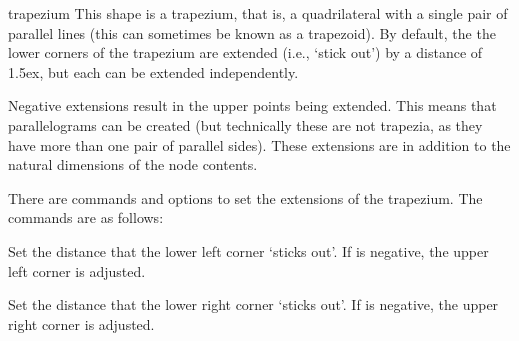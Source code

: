 \begin{shape}{trapezium}
	This shape is a trapezium, that is, a quadrilateral with a single
	pair of parallel lines (this can sometimes be known as a trapezoid). 
	By default, the the lower corners of the trapezium are extended 
	(i.e., `stick out') by a distance of 1.5ex, but each can be extended 
	independently.	

	
\begin{codeexample}[]
\end{codeexample}

   Negative extensions result in the upper points being extended. This
   means that parallelograms can be created (but technically these are
   not trapezia, as they have more than one pair of parallel sides).
   These extensions are in addition to the natural dimensions of the
   node contents.
   
\begin{codeexample}[]
\end{codeexample}

	There are \pgfname{} commands and \tikzname{} options to set the 
  	extensions of the trapezium. The \pgfname{} commands are as follows:
	
	\begin{command}{\pgftrapeziumleftextension{}}
    Set the distance that the lower left corner `sticks out'. If 
     is negative, the upper left corner is adjusted.
   \end{command}
   
   \begin{command}{\pgftrapeziumleftextension{}}
    Set the distance that the lower right corner `sticks out'. If 
     is negative, the upper right corner is adjusted.
   \end{command}
   

\end{shape}
